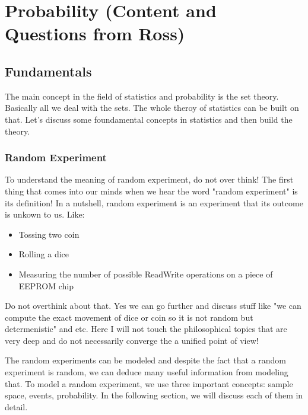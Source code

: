 \chapter{Probability (Content and Questions from Ross)}

\section{Fundamentals}

The main concept in the field of statistics and probability is the set theory. Basically all we deal with the sets. The whole theroy of statistics can be built on that. Let's discuss some foundamental concepts in statistics and then build the theory.

\subsection{Random Experiment}
To understand the meaning of random experiment, do not over think! The first thing that comes into our minds when we hear the word "random experiment" is its definition! In a nutshell, random experiment is an experiment that its outcome is unkown to us. Like:

\begin{itemize}
	\item Tossing two coin
	\item Rolling a dice
	\item Measuring the number of possible ReadWrite operations on a piece of EEPROM chip
\end{itemize}

Do not overthink about that. Yes we can go further and discuss stuff like "we can compute the exact movement of dice or coin so it is not random but determenistic" and etc. Here I will not touch the philosophical topics that are very deep and do not necessarily converge the a unified point of view!

The random experiments can be modeled and despite the fact that a random experiment is random, we can deduce many useful information from modeling that. To model a random experiment, we use three important concepts: sample space, events, probability. In the following section, we will discuss each of them in detail.


